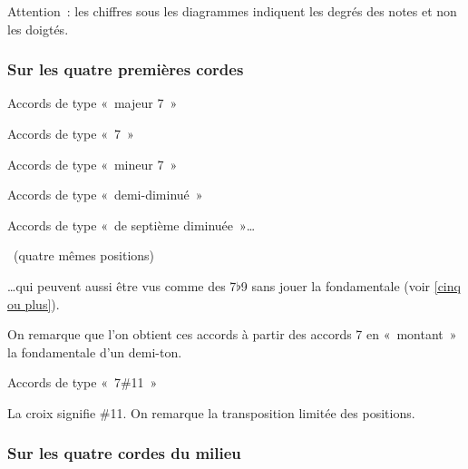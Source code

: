 \documentclass[11pt]{article}
\begin{document}
Attention~: les chiffres sous les diagrammes indiquent les degrés des notes et
non les doigtés.

\subsubsection{Sur les quatre premières cordes}

Accords de type «~majeur 7~»


Accords de type «~7~»


Accords de type «~mineur 7~»


Accords de type «~demi-diminué~»


Accords de type «~de septième diminuée~»…

~(quatre mêmes positions)

…qui peuvent aussi être vus comme des 7$\flat$9 sans jouer la fondamentale
(voir \ref{cinq ou plus}).


On remarque que l’on obtient ces accords à partir des accords 7 en
«~montant~» la fondamentale d’un demi-ton.

Accords de type «~7\#11~»


La croix signifie \#11. On remarque la transposition limitée des positions.

\subsubsection{Sur les quatre cordes du milieu}
\end{document}

